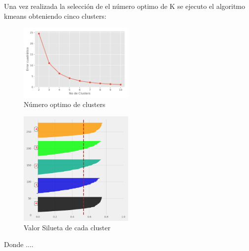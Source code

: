 Una vez realizada la selección de el número optimo de K se ejecuto el algoritmo kmeans obteniendo cinco clusters:

\begin{figure}[H] 
	\centering
	\includegraphics[width=0.5\textwidth]{Kap4/Clusters}
	\caption{Número optimo de clusters} 
	\label{fig:Clusters}
\end{figure}


\begin{figure}[H] 
	\centering
	\includegraphics[width=0.5\textwidth]{Kap4/S}
	\caption{Valor Silueta de cada cluster} 
	\label{fig:S}
\end{figure}



Donde ....

